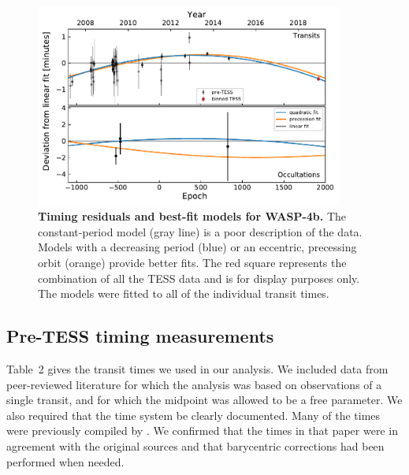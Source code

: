 \documentclass[12pt,twocolumn,tighten]{aastex62}
\begin{document}
\begin{figure}[t]
	\begin{center}
		\leavevmode
		\includegraphics[width=0.9\textwidth]{f4.pdf}
	\end{center}
	\vspace{-0.7cm}
  \caption{ {\bf Timing residuals and best-fit models for WASP-4b.}
   The constant-period
  model (gray line) is a poor description of the data.  Models with a
  decreasing period (blue) or an eccentric, precessing orbit (orange)
  provide	better fits.  The red square
  represents the combination of all the TESS data and is for display
  purposes only.  The models were fitted to all of the individual
  transit times.
  \label{fig:times}
	}
\end{figure}


\subsection{Pre-TESS timing measurements}
\label{subsec:times}

Table~2 gives the transit times we used in our analysis. We included
data from peer-reviewed literature for which the analysis was based on
observations of a single transit, and for which
the midpoint was allowed to be a free parameter. We also required that
the time system be clearly documented. Many of the times were
previously compiled by \citet{hoyer_tramos_2013}. We confirmed that
the times in that paper were in agreement with the original sources
and that barycentric corrections had been performed when needed.
\end{document}
